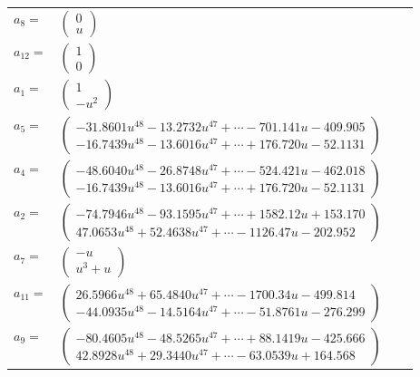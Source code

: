 \documentclass[1p]{elsarticle_modified}
\theoremstyle{definition}
\begin{document}
\begin{tabular}{m{7pt} m{180pt} m{7pt} m{180pt} }
\flushright $a_{8}=$&$\begin{pmatrix}0\\u\end{pmatrix}$ \\
\flushright $a_{12}=$&$\begin{pmatrix}1\\0\end{pmatrix}$ \\
\flushright $a_{1}=$&$\begin{pmatrix}1\\- u^2\end{pmatrix}$ \\
\flushright $a_{5}=$&$\begin{pmatrix}-31.8601 u^{48}-13.2732 u^{47}+\cdots-701.141 u-409.905\\-16.7439 u^{48}-13.6016 u^{47}+\cdots+176.720 u-52.1131\end{pmatrix}$ \\
\flushright $a_{4}=$&$\begin{pmatrix}-48.6040 u^{48}-26.8748 u^{47}+\cdots-524.421 u-462.018\\-16.7439 u^{48}-13.6016 u^{47}+\cdots+176.720 u-52.1131\end{pmatrix}$ \\
\flushright $a_{2}=$&$\begin{pmatrix}-74.7946 u^{48}-93.1595 u^{47}+\cdots+1582.12 u+153.170\\47.0653 u^{48}+52.4638 u^{47}+\cdots-1126.47 u-202.952\end{pmatrix}$ \\
\flushright $a_{7}=$&$\begin{pmatrix}- u\\u^3+u\end{pmatrix}$ \\
\flushright $a_{11}=$&$\begin{pmatrix}26.5966 u^{48}+65.4840 u^{47}+\cdots-1700.34 u-499.814\\-44.0935 u^{48}-14.5164 u^{47}+\cdots-51.8761 u-276.299\end{pmatrix}$ \\
\flushright $a_{9}=$&$\begin{pmatrix}-80.4605 u^{48}-48.5265 u^{47}+\cdots+88.1419 u-425.666\\42.8928 u^{48}+29.3440 u^{47}+\cdots-63.0539 u+164.568\end{pmatrix}$ \\

\end{tabular}
\end{document}
